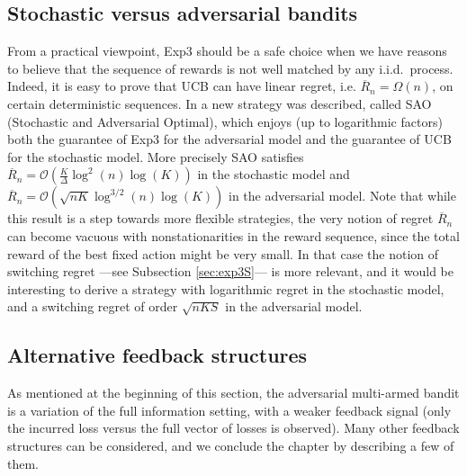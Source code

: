 \documentclass[11pt]{hackednow}
\newcommand{\oR}{\overline{R}}
\begin{document}
\subsection{Stochastic versus adversarial bandits} \label{sec:best-of-both}
From a practical viewpoint, Exp3 should be a safe choice when we have reasons to believe that the sequence of rewards is not well matched by any i.i.d.\ process. Indeed, it is easy to prove that UCB can have linear regret, i.e. $\oR_n = \Omega(n)$, on certain deterministic sequences. In \cite{BS12} a new strategy was described, called SAO (Stochastic and Adversarial Optimal), which enjoys (up to logarithmic factors) both the guarantee of Exp3 for the adversarial model and the guarantee of UCB for the stochastic model. More precisely SAO satisfies $\oR_n = \mathcal{O} \left(\frac{K}{\Delta} \log^2(n) \log(K) \right)$ in the stochastic model and $\oR_n = \mathcal{O} \left( \sqrt{n K} \log^{3/2}(n) \log(K) \right)$ in the adversarial model. Note that while this result is a step towards more flexible strategies, the very notion of regret $\oR_n$ can become vacuous with nonstationarities in the reward sequence, since the total reward of the best fixed action might be very small. In that case the notion of switching regret ---see Subsection \ref{sec:exp3S}--- is more relevant, and it would be interesting to derive a strategy with logarithmic regret in the stochastic model, and a switching regret of order $\sqrt{n K S}$ in the adversarial model.



\subsection{Alternative feedback structures} \label{sec:feedback}
As mentioned at the beginning of this section, the adversarial multi-armed bandit is a variation of the full information setting, with a weaker feedback signal (only the incurred loss versus the full vector of losses is observed). Many other feedback structures can be considered, and we conclude the chapter by describing a few of them.
\end{document}

